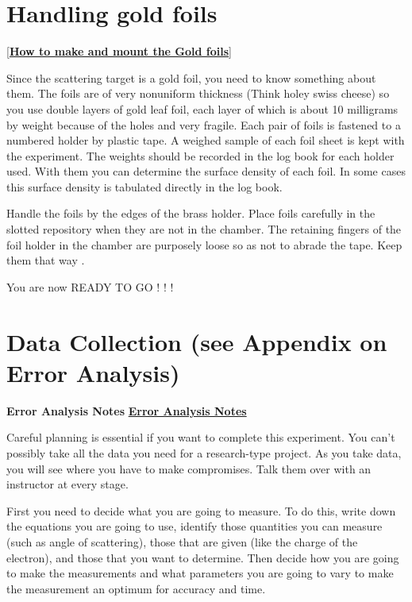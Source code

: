 \documentclass{../lab}
\begin{document}
\section{Handling gold foils}

[\href{http://physics111.lib.berkeley.edu/Physics111/Reprints/RUT/Procedure\%20for\%20Making\%20Foils.pdf}{\textbf{How to make and mount the Gold foils}}]

Since the scattering target is a gold foil, you need to know something about them. The foils are of very nonuniform thickness (Think holey swiss cheese) so you use double layers of gold leaf foil, each layer of which is about 10 milligrams by weight because of the holes and very fragile. Each pair of foils is fastened to a numbered holder by plastic tape. A weighed sample of each foil sheet is kept with the experiment. The weights should be recorded in the log book for each holder used. With them you can determine the surface density of each foil. In some cases this surface density is tabulated directly in the log book.

Handle the foils by the edges of the brass holder. Place foils carefully in the slotted repository when they are not in the chamber. The retaining fingers of the foil holder in the chamber are purposely loose so as not to abrade the tape. Keep them that way .

You are now READY TO GO ! ! !

\section{Data Collection (see Appendix on Error Analysis)}

\textbf{Error Analysis Notes} \href{http://experimentationlab.berkeley.edu/ErrorAnalysisNotes}{\textbf{Error Analysis Notes}}

Careful planning is essential if you want to complete this experiment. You can't possibly take all the data you need for a research-type project. As you take data, you will see where you have to make compromises. Talk them over with an instructor at every stage.

First you need to decide what you are going to measure. To do this, write down the equations you are going to use, identify those quantities you can measure (such as angle of scattering), those that are given (like the charge of the electron), and those that you want to determine. Then decide how you are going to make the measurements and what parameters you are going to vary to make the measurement an optimum for accuracy and time.
\end{document}
